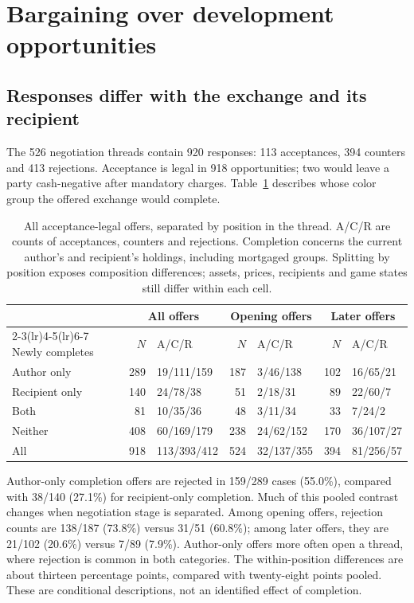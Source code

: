 \section{Bargaining over development opportunities}
\label{sec:bargaining}

\subsection{Responses differ with the exchange and its recipient}

The 526 negotiation threads contain 920 responses: 113 acceptances, 394 counters and 413 rejections. Acceptance is legal in 918 opportunities; two would leave a party cash-negative after mandatory charges. Table~\ref{tab:offers} describes whose color group the offered exchange would complete.

\begin{table}[t]
\centering\small
\begin{tabular}{@{}lrlrlrl@{}}
\toprule
& \multicolumn{2}{c}{All offers} & \multicolumn{2}{c}{Opening offers} & \multicolumn{2}{c}{Later offers}\\
\cmidrule(lr){2-3}\cmidrule(lr){4-5}\cmidrule(lr){6-7}
Newly completes & $N$ & A/C/R & $N$ & A/C/R & $N$ & A/C/R\\
\midrule
Author only & 289 & 19/111/159 & 187 & 3/46/138 & 102 & 16/65/21\\
Recipient only & 140 & 24/78/38 & 51 & 2/18/31 & 89 & 22/60/7\\
Both & 81 & 10/35/36 & 48 & 3/11/34 & 33 & 7/24/2\\
Neither & 408 & 60/169/179 & 238 & 24/62/152 & 170 & 36/107/27\\
\midrule
All & 918 & 113/393/412 & 524 & 32/137/355 & 394 & 81/256/57\\
\bottomrule
\end{tabular}
\caption{All acceptance-legal offers, separated by position in the thread. A/C/R are counts of acceptances, counters and rejections. Completion concerns the current author's and recipient's holdings, including mortgaged groups. Splitting by position exposes composition differences; assets, prices, recipients and game states still differ within each cell.}
\label{tab:offers}
\end{table}

Author-only completion offers are rejected in 159/289 cases (55.0\%), compared with 38/140 (27.1\%) for recipient-only completion. Much of this pooled contrast changes when negotiation stage is separated. Among opening offers, rejection counts are 138/187 (73.8\%) versus 31/51 (60.8\%); among later offers, they are 21/102 (20.6\%) versus 7/89 (7.9\%). Author-only offers more often open a thread, where rejection is common in both categories. The within-position differences are about thirteen percentage points, compared with twenty-eight points pooled. These are conditional descriptions, not an identified effect of completion.

